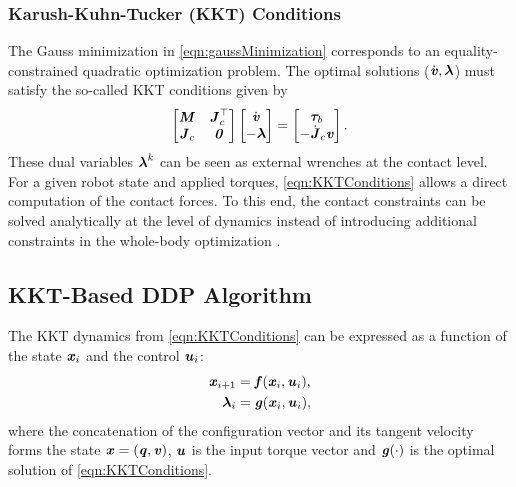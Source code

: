 \subsubsection{Karush-Kuhn-Tucker (KKT) Conditions}
The Gauss minimization in \cref{eqn:gaussMinimization} corresponds to an 
equality-constrained quadratic optimization problem. The optimal solutions ($\dot{\bm{\mathit{v}}},\bm{\mathit{\lambda}}$) must satisfy the so-called \gls{KKT} conditions given by
\begin{equation}\label{eqn:KKTConditions}
\left[\begin{matrix}\bm{\mathit{M}} & \bm{\mathit{J}}^{\top}_c \\{\bm{\mathit{J}}_{c}} & \bm{\mathit{0}}\end{matrix}\right] \left[\begin{matrix} \dot{\bm{\mathit{v}}} \\ -\boldsymbol{\lambda} \end{matrix}\right] = \left[\begin{matrix} \boldsymbol{\tau}_b \\ -\dot{\bm{\mathit{J}}}_c \bm{\mathit{v}}\end{matrix}\right].
\end{equation}
These dual variables $\bm{\mathit{\lambda}}^k$ can be seen as external wrenches at the contact level. For a given robot state and applied torques, \cref{eqn:KKTConditions} allows a direct computation of the contact forces. To this end, the contact constraints can be solved analytically at the level of dynamics instead of introducing additional constraints in the whole-body optimization \cite{saab2013dynamic}.  

\subsection{KKT-Based DDP Algorithm}
The \gls{KKT} dynamics from \cref{eqn:KKTConditions} can be expressed as a function of the state $\bm{\mathit{x}}_i$ and the control $\bm{\mathit{u}}_i$:
\begin{align}\label{eqn:KKTFunctions}
\begin{split}
\bm{\mathit{x}}_{i+1}&=\bm{\mathit{f}}(\bm{\mathit{x}}_i,\bm{\mathit{u}}_i),\\
\bm{\mathit{\lambda}}_i&=\bm{\mathit{g}}(\bm{\mathit{x}}_i,\bm{\mathit{u}}_i),
\end{split}
\end{align}
where the concatenation of the configuration vector and its tangent velocity forms the state $\bm{\mathit{x}}=(\bm{\mathit{q}},\bm{\mathit{v}})$, $\bm{\mathit{u}}$ is the input torque vector and $\bm{\mathit{g}}(\cdot)$ is the optimal solution of \cref{eqn:KKTConditions}.

